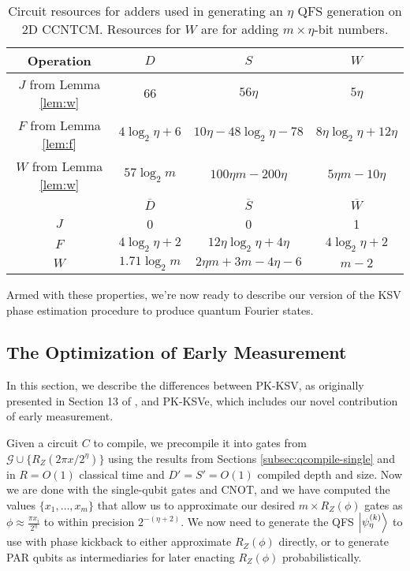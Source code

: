 \begin{table}[hbt!]
\begin{center}
\begin{tabular}{|c|c|c|c|}
\hline
Operation & $D$ & $S$ & $W$ \\
\hline
$J$ from Lemma \ref{lem:w} & $66$ & $56\eta$ & $5\eta$ \\
$F$ from Lemma \ref{lem:f} & $4\log_2 \eta + 6$ & $10\eta - 48\log_2 \eta - 78$ & $8\eta \log_2 \eta + 12\eta$ \\
$W$ from Lemma \ref{lem:w} & $57\log_2 m$ & $100\eta m - 200\eta$ & $5\eta m - 10\eta$ \\
\hline
                           & $\overline{D}$ & $\overline{S}$ & $\overline{W}$ \\
\hline
 $J$                       & 0 & 0 & 1 \\
 $F$                          & $4\log_2 \eta + 2$ & $12\eta \log_2 \eta + 4\eta$ & $4\log_2 \eta + 2$  \\
 $W$                          & $1.71\log_2 m$ & $2\eta m + 3m - 4\eta - 6$ & $m-2$\\
\hline
\end{tabular}
\caption[Circuit resources for adders used in generating an $\eta$ QFS generation on \textsf{2D CCNTCM}.]{Circuit resources for adders used in generating an $\eta$ QFS generation on \textsf{2D CCNTCM}.
Resources for $W$ are for adding $m\times \eta$-bit numbers.}
\label{tab:qfs-adder}
\end{center}
\end{table}

Armed with these properties, we're now ready to describe our version of the
KSV phase estimation procedure to produce quantum Fourier states.

\subsection{The Optimization of Early Measurement}
\label{subsec:ksv-diff}

In this section, we describe the differences between PK-KSV, as originally
presented in Section 13 of \cite{Kitaev2002}, and PK-KSVe, which includes our
novel contribution of early measurement.

Given a circuit $C$ to compile, we
precompile it into gates from $\mathcal{G} \cup \{R_Z(2\pi x / 2^{\eta})\}$
using the results from Sections \ref{subsec:qcompile-single} and
in $R = O(1)$ classical time and $D'=S'=O(1)$ compiled depth and size.
Now we are done with the single-qubit gates and CNOT, and we have computed
the values $\{x_1, \ldots , x_m\}$ that allow us to approximate our
desired $m\times R_Z(\phi)$ gates as $\phi \approx \frac{\pi x_i}{2^{\eta}}$
to within precision
$2^{-(\eta+2)}$. We now need to generate the QFS $\left\vert{\psi_{\eta}^{(k)}}\right\rangle$ to use with
phase kickback to either approximate $R_Z(\phi)$ directly, or to generate
PAR qubits as intermediaries for later enacting $R_Z(\phi)$ probabilistically.


